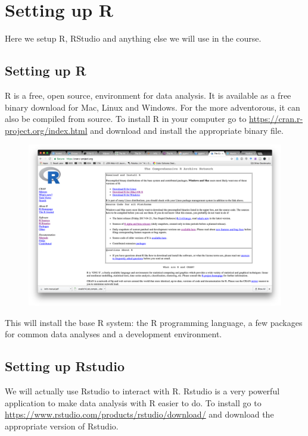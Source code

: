 \documentclass[12pt,]{book}
\theoremstyle{definition}
\theoremstyle{definition}
\theoremstyle{remark}
\begin{document}
\chapter{Setting up R}\label{setting-up-r}

Here we setup R, RStudio and anything else we will use in the course.

\section{Setting up R}\label{setting-up-r-1}

R is a free, open source, environment for data analysis. It is available
as a free binary download for Mac, Linux and Windows. For the more
adventorous, it can also be compiled from source. To install R in your
computer go to \url{https://cran.r-project.org/index.html} and download
and install the appropriate binary file.

\begin{figure}
\centering
\includegraphics{img/cran.png}
\caption{}
\end{figure}

This will install the base R system: the R programming language, a few
packages for common data analyses and a development environment.

\section{Setting up Rstudio}\label{setting-up-rstudio}

We will actually use Rstudio to interact with R. Rstudio is a very
powerful application to make data analysis with R easier to do. To
install go to \url{https://www.rstudio.com/products/rstudio/download/}
and download the appropriate version of Rstudio.
\end{document}
